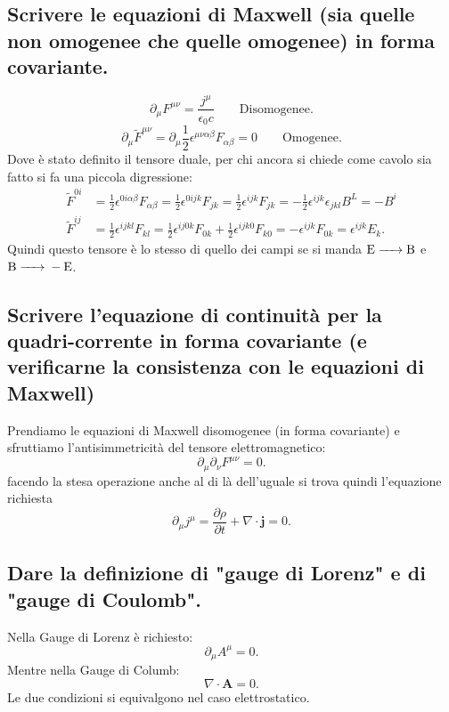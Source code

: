\subsection[ Equazioni di Maxwell in forma covariante]{Scrivere le equazioni di Maxwell (sia quelle non omogenee che quelle omogenee) in forma covariante.}
\label{sec:3.a.4}
\[
	\partial_{\mu}F^{\mu \nu} = \frac{j^{\mu}}{\epsilon_0c} \quad \quad \text{Disomogenee}
.\]  
\[
	\partial_{\mu} \tilde{F}^{\mu \nu}= \partial_{\mu}\frac{1}{2} \epsilon^{\mu\nu\alpha\beta}F_{\alpha\beta} = 0 \quad \quad \text{Omogenee}
.\]  
Dove è stato definito il tensore duale, per chi ancora si chiede come cavolo sia fatto si fa una piccola digressione:
\begin{align*}
	\tilde{F}^{0i}&= \frac{1}{2}\epsilon^{0i\alpha\beta}F_{\alpha\beta}=\frac{1}{2}\epsilon^{0ijk}F_{jk}=\frac{1}{2}\epsilon^{ijk}F_{jk}=
	-\frac{1}{2}\epsilon^{ijk}\epsilon_{jkl}B^{L}= -B^{i}\\
	\tilde{F}^{ij}&=\frac{1}{2}\epsilon^{ijkl}F_{kl}=\frac{1}{2}\epsilon^{ij0k}F_{0k}+ \frac{1}{2}\epsilon^{ijk 0}F_{k 0}=
	-\epsilon^{ijk}F_{0k}= \epsilon^{ijk}E_{k}
.\end{align*}
Quindi questo tensore è lo stesso di quello dei campi se si manda $\ce{ E -> B}$ e $\ce{ B -> - E}$.

\subsection[ Equazione di continuità per la 4-corrente]{Scrivere l'equazione di continuità per la quadri-corrente in forma covariante (e verificarne la consistenza con le equazioni di Maxwell)}
\label{sec:3.a.5}
Prendiamo le equazioni di Maxwell disomogenee (in forma covariante) e sfruttiamo l'antisimmetricità del tensore elettromagnetico:
\[
	\partial_{\mu}\partial_{\nu}F^{\mu\nu}=0
.\] 
facendo la stesa operazione anche al di là dell'uguale si trova quindi l'equazione richiesta
\[
	\partial_{\mu}j^{\mu}= \frac{\partial \rho}{\partial t} + \nabla\cdot \boldsymbol{j}=0
.\] 
\subsection[ Gauge di Lorentz e di Coulomb]{Dare la definizione di "gauge di Lorenz" e di "gauge di Coulomb".}
\label{sec:3.a.6}
Nella Gauge di Lorenz è richiesto:
\[
	\partial_{\mu}A^{\mu}=0
.\] 
Mentre nella Gauge di Columb:
\[
	\nabla\cdot \boldsymbol{A}=0
.\] 
Le due condizioni si equivalgono nel caso elettrostatico.

